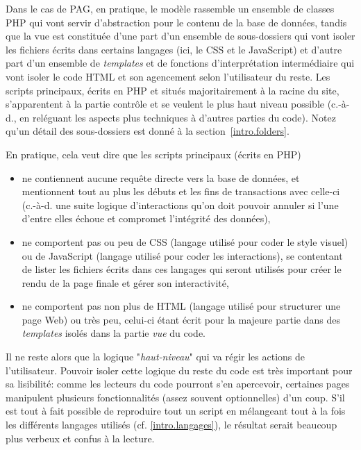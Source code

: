 Dans le cas de PAG, en pratique, le modèle rassemble un ensemble de classes PHP qui vont servir 
d'abstraction pour le contenu de la base de données, tandis que la vue est constituée d'une part 
d'un ensemble de sous-dossiers qui vont isoler les fichiers écrits dans certains langages (ici, 
le CSS et le JavaScript) et d'autre part d'un ensemble de \textit{templates} et %
de fonctions d'interprétation intermédiaire qui vont isoler le code HTML et son agencement selon 
l'utilisateur du reste. Les scripts principaux, écrits en PHP et situés majoritairement à la 
racine du site, s'apparentent à la partie contrôle et se veulent le plus haut niveau possible 
(c.-à-d., en reléguant les aspects plus techniques à d'autres parties du code). Notez qu'un 
détail des sous-dossiers est donné à la section~\ref{intro.folders}.

En pratique, cela veut dire que les scripts principaux (écrits en PHP)
\begin{itemize}
\item ne contiennent aucune requête directe vers la base de données, et mentionnent tout au plus 
les débuts et les fins de transactions avec celle-ci (c.-à-d. une suite logique d'interactions 
qu'on doit pouvoir annuler si l'une d'entre elles échoue et compromet l'intégrité des données), 
\item ne comportent pas ou peu de CSS (langage utilisé pour coder le style visuel) ou de 
JavaScript (langage utilisé pour coder les interactions), se contentant de lister les fichiers 
écrits dans ces langages qui seront utilisés pour créer le rendu de la page finale et gérer 
son interactivité, 
\item ne comportent pas non plus de HTML (langage utilisé pour structurer une page Web) ou très 
peu, celui-ci étant écrit pour la majeure partie dans des \textit{templates} isolés dans la 
partie \textit{vue} du code.
\end{itemize}
\vspace{0.3cm}

Il ne reste alors que la logique "\textit{haut-niveau}" qui va régir les actions de l'utilisateur. 
Pouvoir isoler cette logique du reste du code est très important pour sa lisibilité: comme les 
lecteurs du code pourront s'en apercevoir, certaines pages manipulent plusieurs fonctionnalités 
(assez souvent optionnelles) d'un coup. S'il est tout à fait possible de reproduire tout un script 
en mélangeant tout à la fois les différents langages utilisés (cf. \ref{intro.langages}), 
le résultat serait beaucoup plus verbeux et confus à la lecture.

